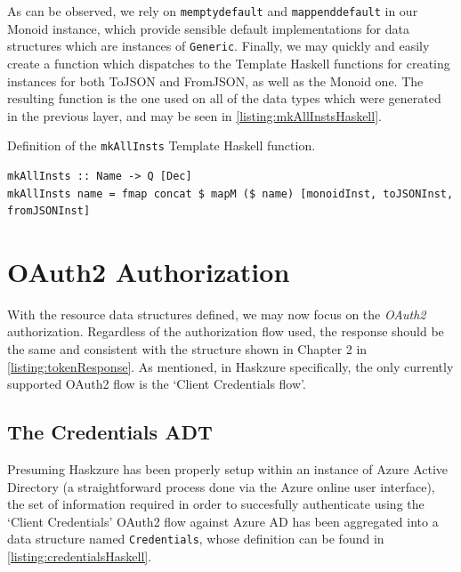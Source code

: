\documentclass[11pt]{report}
\begin{document}
As can be observed, we rely on \texttt{memptydefault} and
\texttt{mappenddefault} in our Monoid instance, which provide sensible default
implementations for data structures which are instances of \texttt{Generic}.
\newline
Finally, we may quickly and easily create a function which dispatches to the
Template Haskell functions for creating instances for both ToJSON and FromJSON,
as well as the Monoid one. The resulting function is the one used on all of the
data types which were generated in the previous layer, and may be seen in
\autoref{listing:mkAllInstsHaskell}.

\begin{listing}
\caption{Definition of the \texttt{mkAllInsts} Template Haskell function.}
\label{listing:mkAllInstsHaskell}
\begin{verbatim}
mkAllInsts :: Name -> Q [Dec]
mkAllInsts name = fmap concat $ mapM ($ name) [monoidInst, toJSONInst, fromJSONInst]
\end{verbatim}
\end{listing}

\section{OAuth2 Authorization} %

With the resource data structures defined, we may now focus on the
\textit{OAuth2} authorization. Regardless of the authorization flow used,
the response should be the same and consistent with the structure
shown in Chapter 2 in \autoref{listing:tokenResponse}. As mentioned, in Haskzure
specifically, the only currently supported OAuth2 flow is the `Client
Credentials flow'.

\subsection{The Credentials ADT}

Presuming Haskzure has been properly setup within an instance of Azure
Active Directory (a straightforward process done via the Azure online user
interface), the set of information required in order to succesfully
authenticate using the `Client Credentials' OAuth2 flow against Azure AD has
been aggregated into a data structure named \texttt{Credentials}, whose
definition can be found in \autoref{listing:credentialsHaskell}.
\end{document}
